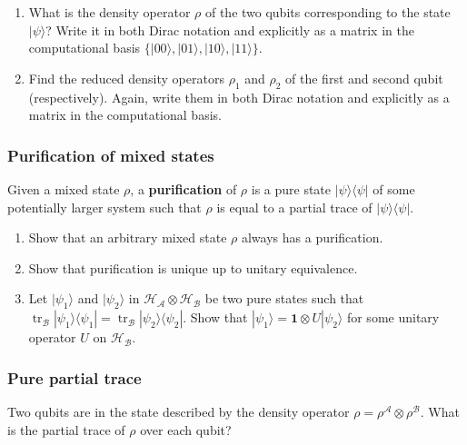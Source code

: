 \documentclass[fleqn]{article}
\begin{document}
\begin{enumerate}
\def\labelenumi{\arabic{enumi}.}
\item
  What is the density operator \(\rho\) of the two qubits corresponding to the state \(|\psi\rangle\)?
  Write it in both Dirac notation and explicitly as a matrix in the computational basis \(\{|00\rangle,|01\rangle,|10\rangle,|11\rangle\}\).
\item
  Find the reduced density operators \(\rho_1\) and \(\rho_2\) of the first and second qubit (respectively).
  Again, write them in both Dirac notation and explicitly as a matrix in the computational basis.
\end{enumerate}

\hypertarget{purification-of-mixed-states}{%
\subsubsection{Purification of mixed states}\label{purification-of-mixed-states}}

Given a mixed state \(\rho\), a \textbf{purification} of \(\rho\) is a pure state \(|\psi\rangle\langle\psi|\) of some potentially larger system such that \(\rho\) is equal to a partial trace of \(|\psi\rangle\langle\psi|\).

\begin{enumerate}
\def\labelenumi{\arabic{enumi}.}
\item
  Show that an arbitrary mixed state \(\rho\) always has a purification.
\item
  Show that purification is unique up to unitary equivalence.
\item
  Let \(|\psi_1\rangle\) and \(|\psi_2\rangle\) in \(\mathcal{H}_{\mathcal{A}}\otimes\mathcal{H}_{\mathcal{B}}\) be two pure states such that \(\operatorname{tr}_{\mathcal{B}}|\psi_1\rangle\langle\psi_1| = \operatorname{tr}_{\mathcal{B}}|\psi_2\rangle\langle\psi_2|\).
  Show that \(|\psi_1\rangle = \mathbf{1}\otimes U|\psi_2\rangle\) for some unitary operator \(U\) on \(\mathcal{H}_{\mathcal{B}}\).
\end{enumerate}

\hypertarget{pure-partial-trace}{%
\subsubsection{Pure partial trace}\label{pure-partial-trace}}

Two qubits are in the state described by the density operator \(\rho = \rho^\mathcal{A}\otimes\rho^\mathcal{B}\).
What is the partial trace of \(\rho\) over each qubit?
\end{document}
